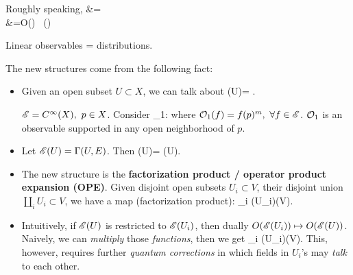 \documentclass[11pt, oneside]{article}
\begin{document}
\begin{figure}[!htpb]
\end{figure}
\ei

\vspace{1cm} Roughly speaking, 
\bea
{} &= \\
&=O(\sE) \ ()
\eea
\begin{eg}
Linear observables = distributions.
\end{eg}

The new structures come from the following fact:
\begin{itemize}
\item Given an open subset $U\subset X$, we can talk about
\bea {}(U)= .\eea

\begin{eg}
${\mathscr E}=C^\infty(X),\ p\in X$. Consider 
\bea \cO_1: \sE \ra \bR\eea
where ${\mathcal O}_1(f)=f(p)^m, \ \forall f\in {\mathscr E}$. ${\mathcal O}_1$ is an observable supported in any open neighborhood of $p$.
\end{eg}

\item Let ${\mathscr E}(U)=\Gamma(U,E)$. Then 
\bea
{}(U)=  \sE(U).
\eea

\item The new structure is the \textbf{factorization product / operator product expansion (OPE)}. Given disjoint open subsets $U_i \subset V$, their disjoint union $\coprod_i U_i \subset V$, we have a map (factorization product):
\bea
\bigotimes_i (U_i)\mapsto {}(V).
\eea

\item Intuitively, if ${\mathscr E}(U)$ is restricted to ${\mathscr E}(U_i)$, then dually $O({\mathscr E}(U_i))\mapsto O({\mathscr E}(U))$.
Naively, we can {\em multiply} those {\em functions}, then we get
\bea
\bigotimes_i (U_i)\mapsto {}(V).
\eea
This, however, requires further {\em quantum corrections} in which fields in $U_i$'s may {\em talk} to each other.
\end{itemize}
\end{document}

